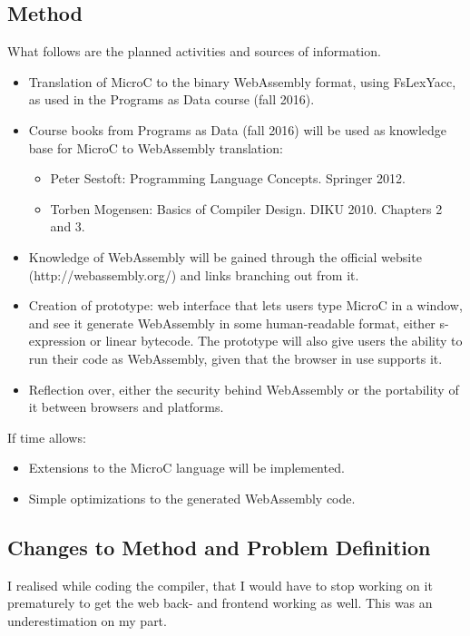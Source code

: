 \documentclass[a4paper]{article}
\makeatletter
\newcommand\footnoteref[1]{\protected@xdef\@thefnmark{\ref{#1}}\@footnotemark}
\makeatother
\begin{document}
\subsection{Method}
\label{sec:problem-definition:method}
What follows are the planned activities and sources of information.
\begin{itemize}
	\item Translation of MicroC to the binary WebAssembly format, using FsLexYacc\footnoteref{footnote:fslexyacc-url}, as used in the Programs as Data course (fall 2016).
	\item Course books from Programs as Data (fall 2016) will be used as knowledge base for MicroC to WebAssembly translation:
		\begin{itemize}
			\item Peter Sestoft: Programming Language Concepts. Springer 2012.
			\item Torben Mogensen: Basics of Compiler Design. DIKU 2010. Chapters 2 and 3.
		\end{itemize}
	\item Knowledge of WebAssembly will be gained through the official website (http://webassembly.org/) and links branching out from it.
	\item Creation of prototype: web interface that lets users type MicroC in a window, and see it generate WebAssembly in some human-readable format, either s-expression or linear bytecode. The prototype will also give users the ability to run their code as WebAssembly, given that the browser in use supports it.
	\item Reflection over, either the security behind WebAssembly or the portability of it between browsers and platforms.
\end{itemize}

\noindent If time allows:
\begin{itemize}
	\item Extensions to the MicroC language will be implemented.
	\item Simple optimizations to the generated WebAssembly code.
\end{itemize}

\subsection{Changes to Method and Problem Definition}
\label{sec:problem-definition:changes}
I realised while coding the compiler, that I would have to stop working on it prematurely to get the web back- and frontend working as well. This was an underestimation on my part.
\end{document}
